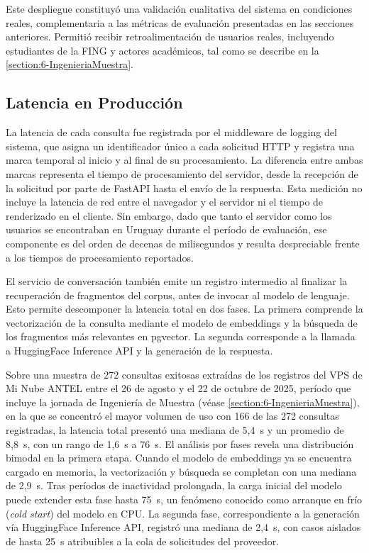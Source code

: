 Este despliegue constituyó una validación cualitativa del sistema en condiciones reales, complementaria a las métricas de evaluación presentadas en las secciones anteriores. Permitió recibir retroalimentación de usuarios reales, incluyendo estudiantes de la FING y actores académicos, tal como se describe en la \autoref{section:6-IngenieriaMuestra}.

\subsection{Latencia en Producción}
\label{subsection:6-Latencia}

La latencia de cada consulta fue registrada por el middleware de logging del sistema, que asigna un identificador único a cada solicitud HTTP y registra una marca temporal al inicio y al final de su procesamiento. La diferencia entre ambas marcas representa el tiempo de procesamiento del servidor, desde la recepción de la solicitud por parte de FastAPI hasta el envío de la respuesta. Esta medición no incluye la latencia de red entre el navegador y el servidor ni el tiempo de renderizado en el cliente. Sin embargo, dado que tanto el servidor como los usuarios se encontraban en Uruguay durante el período de evaluación, ese componente es del orden de decenas de milisegundos y resulta despreciable frente a los tiempos de procesamiento reportados.

El servicio de conversación también emite un registro intermedio al finalizar la recuperación de fragmentos del corpus, antes de invocar al modelo de lenguaje. Esto permite descomponer la latencia total en dos fases. La primera comprende la vectorización de la consulta mediante el modelo de embeddings y la búsqueda de los fragmentos más relevantes en pgvector. La segunda corresponde a la llamada a HuggingFace Inference API y la generación de la respuesta.

Sobre una muestra de 272 consultas exitosas extraídas de los registros del VPS de Mi Nube ANTEL entre el 26 de agosto y el 22 de octubre de 2025, período que incluye la jornada de Ingeniería de Muestra (véase \autoref{section:6-IngenieriaMuestra}), en la que se concentró el mayor volumen de uso con 166 de las 272 consultas registradas, la latencia total presentó una mediana de 5,4~s y un promedio de 8,8~s, con un rango de 1,6~s a 76~s. El análisis por fases revela una distribución bimodal en la primera etapa. Cuando el modelo de embeddings ya se encuentra cargado en memoria, la vectorización y búsqueda se completan con una mediana de 2,9~s. Tras períodos de inactividad prolongada, la carga inicial del modelo puede extender esta fase hasta 75~s, un fenómeno conocido como arranque en frío (\textit{cold start}) del modelo en CPU. La segunda fase, correspondiente a la generación vía HuggingFace Inference API, registró una mediana de 2,4~s, con casos aislados de hasta 25~s atribuibles a la cola de solicitudes del proveedor.


